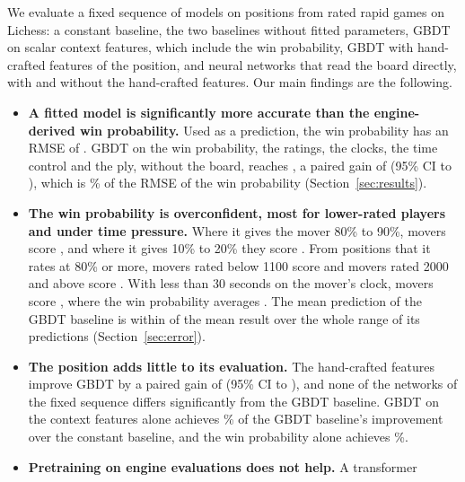 \documentclass[11pt]{article}
\begin{document}
We evaluate a fixed sequence of models on  positions from rated
rapid games on Lichess: a constant baseline, the two baselines without fitted
parameters, GBDT on scalar context features, which include the win
probability, GBDT with hand-crafted features of the position, and neural
networks that read the board directly, with and without the hand-crafted
features. Our main findings are the following.
\begin{itemize}
\item \textbf{A fitted model is significantly more accurate than the
engine-derived win probability.} Used as a prediction, the win probability
has an RMSE of . GBDT on the win probability, the
ratings, the clocks, the time control and the ply, without the board, reaches
, a paired gain of
 (95\% CI
 to
), which is
\% of the RMSE of the win
probability (Section~\ref{sec:results}).
\iflook
\item \textbf{The win probability is overconfident, most for lower-rated
players and under time pressure.} Where it gives the mover 80\% to 90\%,
movers score , and where it gives 10\% to 20\%
they score . From positions that it rates at 80\%
or more, movers rated below 1100 score 
and movers rated 2000 and above score .
With less than 30 seconds on the mover's clock, movers score
, where the win probability averages
. The mean prediction of the GBDT
baseline is within  of the mean result
over the whole range of its predictions (Section~\ref{sec:error}).
\fi
\item \textbf{The position adds little to its evaluation.} The hand-crafted
features improve GBDT by a paired gain of 
(95\% CI  to
), and none of the 
networks of the fixed sequence differs significantly from the GBDT baseline.
GBDT on the context features alone achieves \% of the
GBDT baseline's improvement over the constant baseline, and the win
probability alone achieves \%.
\ifchangestart
\item \textbf{Pretraining on engine evaluations does not help.} A transformer

\end{itemize}
\end{document}
